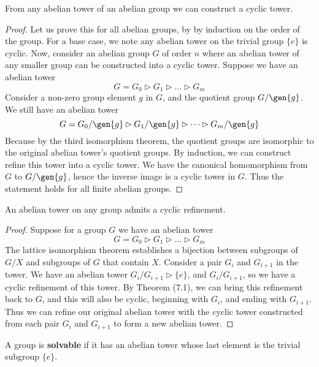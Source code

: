 \begin{theorem}
    From any abelian tower of an abelian group we can construct a cyclic tower.
\end{theorem}
\begin{proof}
    Let us prove this for all abelian groups, by by induction on the order of the group. For a base case, we note any abelian tower on the trivial group $\{e\}$ is cyclic. Now, consider an abelian group $G$ of order $n$ where an abelian tower of any smaller group can be constructed into a cyclic tower. Suppose we have an abelian tower
    \[ G = G_0 \rhd G_1 \rhd \dots \rhd G_m \]
    Consider a non-zero group element $g$ in $G$, and the quotient group $G/\gen{g}$. We still have an abelian tower
    \[ G = G_0/\gen{g} \rhd G_1/\gen{g} \rhd \dots \rhd G_m/\gen{g} \]
    Because by the third isomorphism theorem, the quotient groups are isomorphic to the original abelian tower's quotient groups. By induction, we can construct refine this tower into a cyclic tower. We have the canonical homomorphism from $G$ to $G/\gen{g}$, hence the inverse image is a cyclic tower in $G$. Thus the statement holds for all finite abelian groups.
\end{proof}

\begin{corollary}
    An abelian tower on any group admits a cyclic refinement.
\end{corollary}
\begin{proof}
    Suppose for a group $G$ we have an abelian tower
    \[ G = G_0 \rhd G_1 \rhd \dots \rhd G_m \]
    The lattice isomorphism theorem establishes a bijection between subgroups of $G/X$ and subgroups of $G$ that contain $X$. Consider a pair $G_i$ and $G_{i+1}$ in the tower. We have an abelian tower $G_i/G_{i+1} \rhd \{e\}$, and $G_i/G_{i+1}$, so we have a cyclic refinement of this tower. By Theorem (7.1), we can bring this refinement back to $G$, and this will also be cyclic, beginning with $G_i$, and ending with $G_{i+1}$. Thus we can refine our original abelian tower with the cyclic tower constructed from each pair $G_i$ and $G_{i+1}$ to form a new abelian tower.
\end{proof}

A group is {\bf solvable}  if it has an abelian tower whose last element is the trivial subgroup $\{e\}$.

